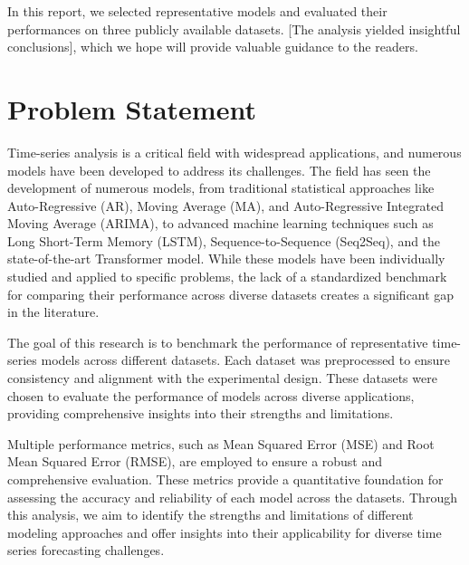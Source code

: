 \documentclass{scrartcl}
\begin{document}
In this report, we selected representative models and evaluated their performances on three publicly available datasets. [The analysis yielded insightful conclusions], which we hope will provide valuable guidance to the readers.


\section{Problem Statement}
Time-series analysis is a critical field with widespread applications, and numerous models have been developed to address its challenges. The field has seen the development of numerous models, from traditional statistical approaches like Auto-Regressive (AR), Moving Average (MA), and Auto-Regressive Integrated Moving Average (ARIMA), to advanced machine learning techniques such as Long Short-Term Memory (LSTM), Sequence-to-Sequence (Seq2Seq), and the state-of-the-art Transformer model. While these models have been individually studied and applied to specific problems, the lack of a standardized benchmark for comparing their performance across diverse datasets creates a significant gap in the literature.

The goal of this research is to benchmark the performance of representative time-series models across different datasets. Each dataset was preprocessed to ensure consistency and alignment with the experimental design. These datasets were chosen to evaluate the performance of models across diverse applications, providing comprehensive insights into their strengths and limitations.

Multiple performance metrics, such as Mean Squared Error (MSE) and Root Mean Squared Error (RMSE), are employed to ensure a robust and comprehensive evaluation. These metrics provide a quantitative foundation for assessing the accuracy and reliability of each model across the datasets. Through this analysis, we aim to identify the strengths and limitations of different modeling approaches and offer insights into their applicability for diverse time series forecasting challenges.

 
\end{document}
